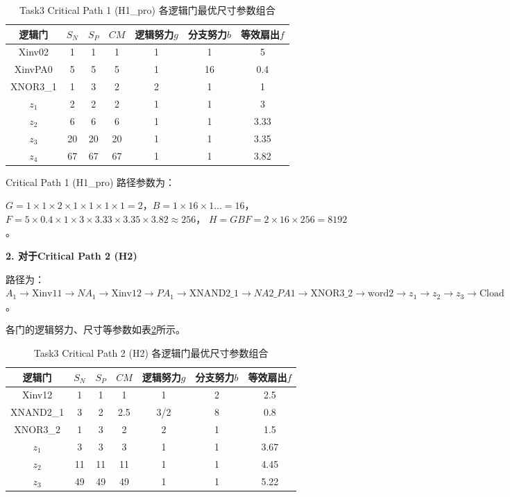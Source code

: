 \documentclass[UTF8,12pt,a4paper]{ctexart}
\begin{document}
\begin{table}[htbp]
\centering
\caption{Task3 Critical Path 1 (H1\_pro) 各逻辑门最优尺寸参数组合}
\label{tab:task3_h1_best_gate_params}
\begin{tabular}{ccccccc}
\toprule
逻辑门 & $S_N$ & $S_P$ & $CM$ & 逻辑努力$g$ & 分支努力$b$ & 等效扇出$f$ \\
\midrule
Xinv02    & 1 & 1 & 1 & 1 & 1 & 5 \\
XinvPA0   & 5 & 5 & 5 & 1 & 16 & 0.4 \\
XNOR3\_1  & 1 & 3 & 2 & 2 & 1 & 1 \\
$z_1$     & 2 & 2 & 2 & 1 & 1 & 3 \\
$z_2$     & 6 & 6 & 6 & 1 & 1 & 3.33 \\
$z_3$     & 20 & 20 & 20 & 1 & 1 & 3.35 \\
$z_4$     & 67 & 67 & 67 & 1 & 1 & 3.82 \\
\bottomrule
\end{tabular}
\end{table}

Critical Path 1 (H1\_pro) 路径参数为：

$G = 1 \times 1 \times 2 \times 1 \times 1 \times 1 \times 1 = 2$，$B = 1 \times 16 \times 1 \dots = 16$，
$F = 5 \times 0.4 \times 1 \times 3 \times 3.33 \times 3.35 \times 3.82 \approx 256$，
$H = GBF = 2 \times 16 \times 256 = 8192$。


\textbf{2. 对于Critical Path 2 (H2)}

路径为：$A_1 \rightarrow \text{Xinv11} \rightarrow NA_1 \rightarrow \text{Xinv12} \rightarrow PA_1 \rightarrow \text{XNAND2\_1} \rightarrow NA2\_PA1 \rightarrow \text{XNOR3\_2} \rightarrow \text{word2} \rightarrow z_1 \rightarrow z_2 \rightarrow z_3 \rightarrow \text{Cload}$。

各门的逻辑努力、尺寸等参数如表\ref{tab:task3_h2_best_gate_params}所示。

\begin{table}[htbp]
\centering
\caption{Task3 Critical Path 2 (H2) 各逻辑门最优尺寸参数组合}
\label{tab:task3_h2_best_gate_params}
\begin{tabular}{ccccccc}
\toprule
逻辑门 & $S_N$ & $S_P$ & $CM$ & 逻辑努力$g$ & 分支努力$b$ & 等效扇出$f$ \\
\midrule
Xinv12    & 1 & 1 & 1 & 1 & 2 & 2.5 \\
XNAND2\_1 & 3 & 2 & 2.5 & 3/2 & 8 & 0.8 \\
XNOR3\_2  & 1 & 3 & 2 & 2 & 1 & 1.5 \\
$z_1$     & 3 & 3 & 3 & 1 & 1 & 3.67 \\
$z_2$     & 11 & 11 & 11 & 1 & 1 & 4.45 \\
$z_3$     & 49 & 49 & 49 & 1 & 1 & 5.22 \\
\bottomrule
\end{tabular}
\end{table}
\end{document}
